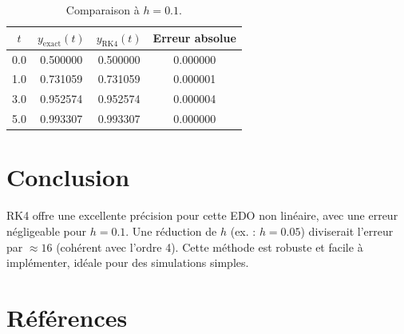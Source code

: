\documentclass[12pt,a4paper]{article}
\begin{document}
\begin{table}[h]
\centering
\begin{tabular}{cccc}
\toprule
$t$ & $y_{\text{exact}}(t)$ & $y_{\text{RK4}}(t)$ & Erreur absolue \\
\midrule
0.0 & 0.500000 & 0.500000 & 0.000000 \\
1.0 & 0.731059 & 0.731059 & 0.000001 \\
3.0 & 0.952574 & 0.952574 & 0.000004 \\
5.0 & 0.993307 & 0.993307 & 0.000000 \\
\bottomrule
\end{tabular}
\caption{Comparaison à $h=0.1$.}
\end{table}

\section{Conclusion}
RK4 offre une excellente précision pour cette EDO non linéaire, avec une erreur négligeable pour $h=0.1$. Une réduction de $h$ (ex. : $h=0.05$) diviserait l'erreur par $\approx 16$ (cohérent avec l'ordre 4). Cette méthode est robuste et facile à implémenter, idéale pour des simulations simples.

\newpage
\section*{Références}


\end{document}
